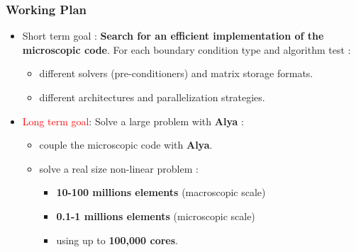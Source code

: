 \documentclass[usenames,dvipsnames]{beamer}
\begin{document}
\begin{frame}
\frametitle{Working Plan}

\begin{itemize}
\item \textcolor{OliveGreen}{Short term goal} : \textbf{Search for an efficient implementation of the microscopic code}. 
 For each boundary condition type and algorithm test :
 \begin{itemize}
  \item different solvers (pre-conditioners) and matrix storage formats.
  \item different architectures and parallelization strategies.
 \end{itemize}

 \item \textcolor{Red}{Long term goal}: Solve a large problem with \textbf{Alya} :
 \begin{itemize}
  \item couple the microscopic code with \textbf{Alya}.
  \item solve a real size non-linear problem :
  \begin{itemize}
  \item \textbf{10-100 millions elements} (macroscopic scale) 
  \item \textbf{0.1-1 millions elements} (microscopic scale) 
  \item using up to \textbf{100,000 cores}.
  \end{itemize}
 \end{itemize}
\end{itemize}

\begin{figure}[hhh!]
\begin{center}
\end{center}
\end{figure}

\end{frame}
\end{document}
